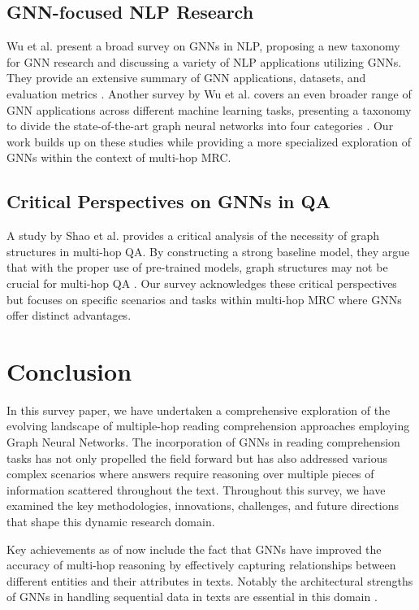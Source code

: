 \documentclass[sigplan,screen,nonacm]{acmart}
\begin{document}
\subsection{GNN-focused NLP Research}

Wu et al. present a broad survey on GNNs in NLP, proposing a new taxonomy for GNN research and discussing a variety of NLP applications utilizing GNNs. 
They provide an extensive summary of GNN applications, datasets, and evaluation metrics \cite{RN23}. Another survey by Wu et al. covers an 
even broader range of GNN applications across different machine learning tasks, presenting a taxonomy to divide the state-of-the-art graph 
neural networks into four categories \cite{RN16}. Our work builds up on these studies while providing a more specialized exploration of GNNs 
within the context of multi-hop MRC. 

\subsection{Critical Perspectives on GNNs in QA}
A study by Shao et al. provides a critical analysis of the necessity of graph structures in multi-hop QA. By constructing a strong baseline model, 
they argue that with the proper use of pre-trained models, graph structures may not be crucial for multi-hop QA \cite{RN127}. Our survey 
acknowledges these critical perspectives but focuses on specific scenarios and tasks within multi-hop MRC where GNNs offer distinct advantages.


\section{Conclusion}
In this survey paper, we have undertaken a comprehensive exploration of the evolving landscape of multiple-hop reading comprehension approaches
employing Graph Neural Networks. The incorporation of GNNs in reading comprehension tasks has not only propelled the field forward but has 
also addressed various complex scenarios where answers require reasoning over multiple pieces of information scattered throughout the text. 
Throughout this survey, we have examined the key methodologies, innovations, challenges, and future directions that shape this dynamic research domain.

Key achievements as of now include the fact that GNNs have improved the accuracy of multi-hop reasoning by effectively capturing 
relationships between different entities and their attributes in texts. Notably the architectural strengths of GNNs in handling sequential 
data in texts are essential in this domain \cite{RN23}. 
\end{document}
